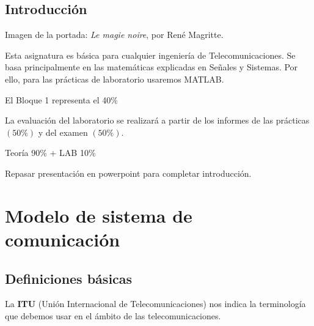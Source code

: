 \documentclass[a4paper]{book}
\begin{document}
\newpage
{}
{}
\section*{Introducción}
Imagen de la portada: \textsl{Le magie noire}, por René Magritte.

Esta asignatura es básica para cualquier ingeniería de Telecomunicaciones. Se basa principalmente en las matemáticas explicadas en Señales y Sistemas. Por ello, para las prácticas de laboratorio usaremos MATLAB.

El Bloque 1 representa el 40\%

La evaluación del laboratorio se realizará a partir de los informes de las prácticas $(50\% )$ y del examen $(50\% )$.

Teoría 90\% + LAB 10\%

Repasar presentación en powerpoint para completar introducción.

\newpage

\setlength{\parskip}{0em}
\tableofcontents
\setlength{\parskip}{0.5em}

\chapter{Modelo de sistema de comunicación}

\section{Definiciones básicas}

La \textbf{ITU} (Unión Internacional de Telecomunicaciones) nos indica la terminología que debemos usar en el ámbito de las telecomunicaciones.
\end{document}
